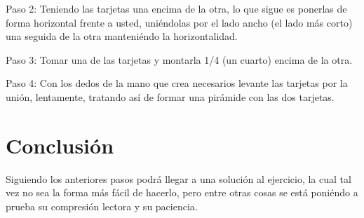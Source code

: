 \documentclass{article}
\begin{document}
     Paso 2: Teniendo las tarjetas una encima de la otra, lo que sigue es ponerlas de forma horizontal frente a usted, uniéndolas por el lado ancho (el lado más corto) una seguida de la otra manteniéndo la horizontalidad.
     
     \vspace{0.3cm}
      
     Paso 3: Tomar una de las tarjetas y montarla 1/4 (un cuarto) encima de la otra.
      
     \vspace{0.3cm}
     
     Paso 4: Con los dedos de la mano que crea necesarios levante las tarjetas por la unión, lentamente, tratando así de formar una pirámide con las dos tarjetas.  
     
      \vspace{1.5cm}
      
\section{Conclusión} 

    Siguiendo los anteriores pasos podrá llegar a una solución al ejercicio, la cual tal vez no sea la forma más fácil de hacerlo, pero entre otras cosas se está poniéndo a prueba su compresión lectora y su paciencia.
\end{document}
